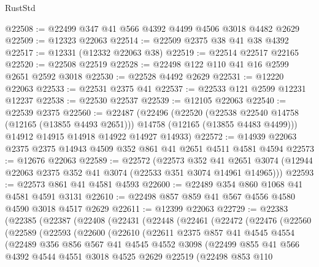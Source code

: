 \begin{lexlean}{RustStd}
\begin{coremodule}
@22508 := @22499 @347 @41 @566 @4392 @4499 @4506 @3018 @4482 @2629
@22509 := @12323 @22063
@22514 := @22509 @2375 @38 @41 @38 @4392
@22517 := @12331 (@12332 @22063 @38)
@22519 := @22514 @22517 @22165
@22520 := @22508 @22519
@22528 := @22498 @122 @110 @41 @16 @2599 @2651 @2592 @3018
@22530 := @22528 @4492 @2629
@22531 := @12220 @22063
@22533 := @22531 @2375 @41
@22537 := @22533 @121 @2599 @12231 @12237
@22538 := @22530 @22537
@22539 := @12105 @22063
@22540 := @22539 @2375
@22560 := @22487
    (@22496
      (@22520
        (@22538 @22540 @14758 (@12165 (@13855 @4493 @2651)))
        @14758
        (@12165 (@13855 @4483 @4499)))
      @14912
      @14915
      @14918
      @14922
      @14927
      @14933)
@22572 := @14939 @22063 @2375 @2375 @14943 @4509 @352 @861 @41 @2651 @4511 @4581 @4594
@22573 := @12676 @22063
@22589 := @22572
    (@22573
      @352
      @41
      @2651
      @3074
      (@12944 @22063 @2375 @352 @41 @3074 (@22533 @351 @3074 @14961 @14965)))
@22593 := @22573 @861 @41 @4581 @4593
@22600 := @22489 @354 @860 @1068 @41 @4581 @4591 @3131
@22610 := @22498 @857 @859 @41 @567 @4556 @4580 @4590 @3018 @4517 @2629
@22611 := @12399 @22063
@22729 := @22383
    (@22385
      (@22387
        (@22408
          (@22431
            (@22448
              (@22461
                (@22472
                  (@22476
                    (@22560
                      (@22589
                        (@22593
                          (@22600
                            (@22610
                              (@22611
                                @2375
                                @857
                                @41
                                @4545
                                @4554
                                (@22489
                                  @356
                                  @856
                                  @567
                                  @41
                                  @4545
                                  @4552
                                  @3098
                                  (@22499
                                    @855
                                    @41
                                    @566
                                    @4392
                                    @4544
                                    @4551
                                    @3018
                                    @4525
                                    @2629
                                    @22519
                                    (@22498
                                      @853
                                      @110

\end{coremodule}
\end{lexlean}
